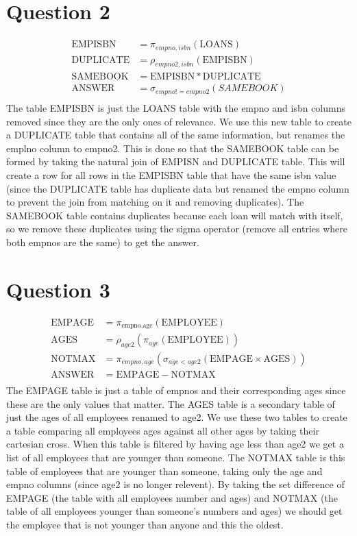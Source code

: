 \documentclass{article}
\begin{document}
\section{Question 2} %
\label{sec:question_2}
\begin{align*}
    \text{EMPISBN} &= \pi_{empno,isbn}(\text{LOANS})\\
    \text{DUPLICATE} &= \rho_{empno2,isbn}(\text{EMPISBN})\\
    \text{SAMEBOOK} &= \text{EMPISBN} * \text{DUPLICATE}\\
    \text{ANSWER} &= \sigma_{empno!=empno2}(SAMEBOOK)\\
\end{align*}
The table EMPISBN is just the LOANS table with the empno and isbn columns removed since they are the only ones of relevance. We use this new table to create a DUPLICATE table that contains all of the same information, but renames the emplno column to empno2. This is done so that the SAMEBOOK table can be formed by taking the natural join of EMPISN and DUPLICATE table. This will create a row for all rows in the EMPISBN table that have the same isbn value (since the DUPLICATE table has duplicate data but renamed the empno column to prevent the join from matching on it and removing duplicates). The SAMEBOOK table contains duplicates because each loan will match with itself, so we remove these duplicates using the sigma operator (remove all entries where both empnos are the same) to get the answer.



\section*{Question 3} %
\label{sec:question_3}
\begin{align*}
    \text{EMPAGE} &= \pi_{\text{empno,age}}(\text{EMPLOYEE})\\
    \text{AGES} &= \rho_{age2}(\pi_{age}(\text{EMPLOYEE}))\\
    \text{NOTMAX} &= \pi_{empno,age}(\sigma_{age<age2}(\text{EMPAGE} \times \text{AGES}))\\
    \text{ANSWER} &= \text{EMPAGE} - \text{NOTMAX}\\
\end{align*}
The EMPAGE table is just a table of empnos and their corresponding ages since these are the only values that matter. The AGES table is a secondary table of just the ages of all employees renamed to age2. We use these two tables to create a table comparing all employees ages against all other ages by taking their cartesian cross. When this table is filtered by having age less than age2 we get a list of all employees that are younger than someone. The NOTMAX table is this table of employees that are younger than someone, taking only the age and empno columns (since age2 is no longer relevent). By taking the set difference of EMPAGE (the table with all employees number and ages) and NOTMAX (the table of all employees younger than someone's numbers and ages) we should get the employee that is not younger than anyone and this the oldest.
\end{document}
